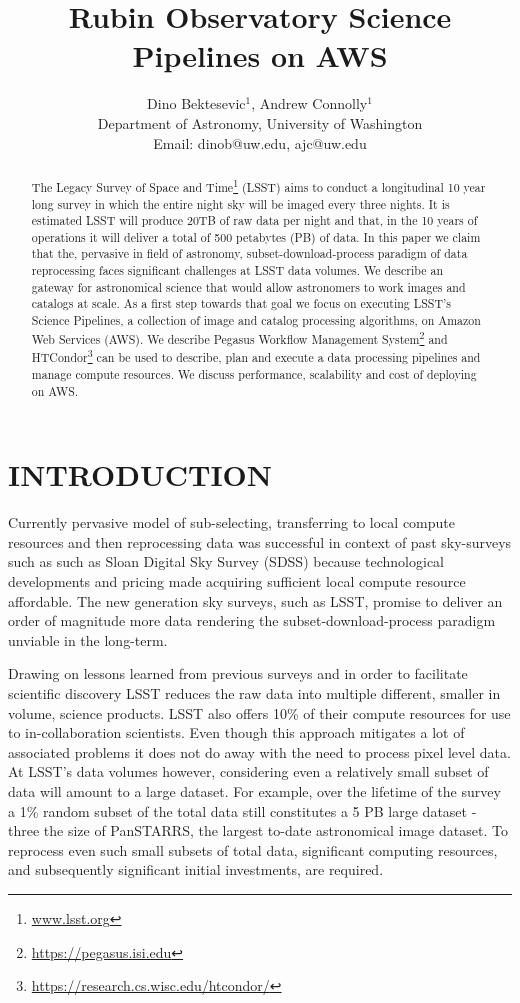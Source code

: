 \documentclass[a4paper, 10pt, conference]{ieeeconf}
\title{\LARGE \bf
Rubin Observatory Science Pipelines on AWS
}
\author{
    Dino Bektesevic$^1$, Andrew Connolly$^1$ \\
    Department of Astronomy, University of Washington \\ Email: dinob@uw.edu, ajc@uw.edu
    }
\begin{document}
\maketitle


\begin{abstract}

The Legacy Survey of Space and Time\footnote{\url{www.lsst.org}} (LSST) aims to conduct a longitudinal 10 year long survey in which the entire night sky will be imaged every three nights. It is estimated LSST will produce 20TB of raw data per night and that, in the 10 years of operations it will deliver a total of 500 petabytes (PB) of data. In this paper we claim that the, pervasive in field of astronomy, subset-download-process paradigm of data reprocessing faces significant challenges at LSST data volumes. We describe an gateway for astronomical science that would allow astronomers to work images and catalogs at scale. As a first step towards that goal we focus on executing LSST's Science Pipelines, a collection of image and catalog processing algorithms, on Amazon Web Services (AWS). We describe Pegasus Workflow Management System\footnote{\url{https://pegasus.isi.edu}} and HTCondor\footnote{\url{https://research.cs.wisc.edu/htcondor/}} can be used to describe, plan and execute a data processing pipelines and manage compute resources. We discuss performance, scalability and cost of deploying on AWS.
\end{abstract}

\section{INTRODUCTION}

Currently pervasive model of sub-selecting, transferring to local compute resources and then reprocessing data was successful in context of past sky-surveys such as such as Sloan Digital Sky Survey\cite{York2000} (SDSS) because technological developments and pricing made acquiring sufficient local compute resource affordable. The new generation sky surveys, such as LSST, promise to deliver an order of magnitude more data rendering the subset-download-process paradigm unviable in the long-term. 

Drawing on lessons learned from previous surveys and in order to facilitate scientific discovery LSST reduces the raw data into multiple different, smaller in volume, science products. LSST also offers 10\% of their compute resources for use to in-collaboration scientists. Even though this approach mitigates a lot of associated problems it does not do away with the need to process pixel level data. At LSST's data volumes however, considering even a relatively small subset of data will amount to a large dataset. For example, over the lifetime of the survey a 1\% random subset of the total data still constitutes a 5 PB large dataset - three the size of PanSTARRS, the largest to-date astronomical image dataset. To reprocess even such small subsets of total data, significant computing resources, and subsequently significant initial investments, are required.
\end{document}
